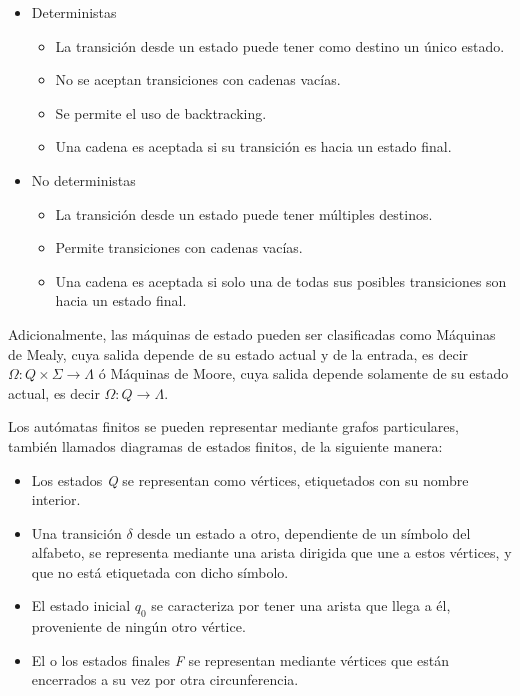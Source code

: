 \documentclass[journal,trans]{IEEEtran}
\begin{document}
	\begin{itemize}
		\item Deterministas
		\begin{itemize}
			\item La transición desde un estado puede tener como destino un único estado.
			\item No se aceptan transiciones con cadenas vacías.
			\item Se permite el uso de backtracking.
			\item Una cadena es aceptada si su transición es hacia un estado final.
		\end{itemize}
		\item No deterministas
		\begin{itemize}
			\item La transición desde un estado puede tener múltiples destinos.
			\item Permite transiciones con cadenas vacías.
			\item Una cadena es aceptada si solo una de todas sus posibles transiciones son hacia un estado final.
		\end{itemize}
	\end{itemize}
	
	Adicionalmente, las máquinas de estado pueden ser clasificadas como Máquinas de Mealy, cuya salida depende de su estado actual y de la entrada, es decir $\Omega: Q \times \Sigma \to \Lambda$ ó Máquinas de Moore, cuya salida depende solamente de su estado actual, es decir $\Omega: Q \to \Lambda$.
	
	Los autómatas finitos se pueden representar mediante grafos particulares, también llamados diagramas de estados finitos, de la siguiente manera:
	
	\begin{itemize}
		\item Los estados \emph{Q} se representan como vértices, etiquetados con su nombre interior.
		\item Una transición $\delta$ desde un estado a otro, dependiente de un símbolo del alfabeto, se representa mediante una arista dirigida que une a estos vértices, y que no está etiquetada con dicho símbolo.
		\item El estado inicial $q_{0}$ se caracteriza por tener una arista que llega a él, proveniente de ningún otro vértice.
		\item El o los estados finales \emph{F} se representan mediante vértices que están encerrados a su vez por otra circunferencia.
	\end{itemize}
	
\end{document}
